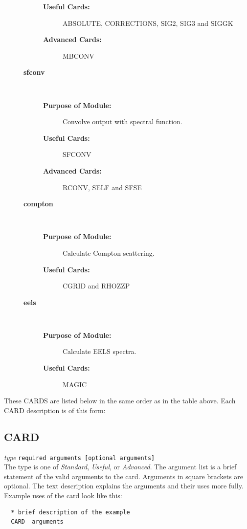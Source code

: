 \documentclass[11pt,oneside]{report} %
\renewcommand{\htmlref}[2]{\hyperlink{#2}{#1}}
\newenvironment{Card}[4]%
      {\vspace{3ex}%
        \subsection{#1}
        \quad\textsl{#3}\newline
        \quad\texttt{#2}\newline%
        \label{card:#4}\\}
      {}
\newcommand{\module}[1]{\textrm{\bf{#1}}}
\renewcommand{\htmlref}[2]{{#1}} %
\begin{document}
\begin{description}
\begin{description}
\begin{description}
  \item[\textbf{Useful Cards:}] \htmlref{ABSOLUTE}{card:abs},
  \htmlref{CORRECTIONS}{card:cor},
    \htmlref{SIG2}{card:sig}, \htmlref{SIG3}{card:si3} and
    \htmlref{SIGGK}{card:siggk}
  \item[\textbf{Advanced Cards:}] \htmlref{MBCONV}{card:mbc}
  \end{description}
\item[{\large\module{sfconv}}]\dotfill\ 
  \begin{description}
  \item[\textbf{Purpose of Module:}] Convolve output with spectral function. 
  \item[\textbf{Useful Cards:}] \htmlref{SFCONV}{card:scc}
  \item[\textbf{Advanced Cards:}]     \htmlref{RCONV}{card:rco},
    \htmlref{SELF}{card:sel} and
    \htmlref{SFSE}{card:sfs}
  \end{description}
\item[{\large\module{compton}}]\dotfill\ 
  \begin{description}
  \item[\textbf{Purpose of Module:}] Calculate Compton scattering. 
  \item[\textbf{Useful Cards:}] \htmlref{CGRID}{card:cgr} and
    \htmlref{RHOZZP}{card:rho}
  \end{description}  
\item[{\large\module{eels}}]\dotfill\ 
  \begin{description}
  \item[\textbf{Purpose of Module:}] Calculate EELS spectra. 
  \item[\textbf{Useful Cards:}] \htmlref{MAGIC}{card:mag}
  \end{description}

  \end{description}

\end{description}


These CARDS are listed below in the same order as in the table above.
Each CARD description is of this form:

\begin{Card}{CARD}{required arguments [optional arguments]}{type}{}
  The type is one of \textsl{Standard}, \textsl{Useful}, or
  \textsl{Advanced}. The argument list is a brief statement of the
  valid arguments to the card. Arguments in square brackets are 
  optional. The text description explains the arguments and 
  their uses more fully. Example uses of the card look like this:
\begin{verbatim}
  * brief description of the example
  CARD  arguments
\end{verbatim}
\end{Card}
\end{document}
